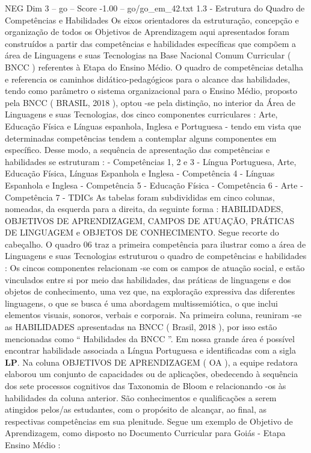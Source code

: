 \begin{textsample}{NEG Dim 3 – go – Score -1.00 – go/go\_em\_42.txt}  \label{ex:f3_neg_246}
1.3 - Estrutura do Quadro de Competências e Habilidades Os eixos orientadores da estruturação, concepção e organização de todos os Objetivos de Aprendizagem aqui apresentados foram construídos a partir das competências e habilidades específicas que compõem a área de Linguagens e suas Tecnologias na Base Nacional Comum Curricular ( BNCC ) referentes à Etapa do Ensino Médio.
O quadro de competências detalha e referencia os caminhos didático-pedagógicos para o alcance das habilidades, tendo como parâmetro o sistema organizacional para o Ensino Médio, proposto pela BNCC ( BRASIL, 2018 ), optou -se pela distinção, no interior da Área de Linguagens e suas Tecnologias, dos cinco componentes curriculares : Arte, Educação Física e Línguas espanhola, Inglesa e Portuguesa - tendo em vista que determinadas competências tendem a contemplar alguns componentes em específico.
Desse modo, a sequência de apresentação das competências e habilidades se estruturam : - Competências 1, 2 e 3 - Língua Portuguesa, Arte, Educação Física, Línguas Espanhola e Inglesa - Competência 4 - Línguas Espanhola e Inglesa - Competência 5 - Educação Física - Competência 6 - Arte - Competência 7 - TDICs As tabelas foram subdivididas em cinco colunas, nomeadas, da esquerda para a direita, da seguinte forma : HABILIDADES, OBJETIVOS DE APRENDIZAGEM, CAMPOS DE ATUAÇÃO, PRÁTICAS DE LINGUAGEM e OBJETOS DE CONHECIMENTO.
Segue recorte do cabeçalho.
O quadro 06 traz a primeira competência para ilustrar como a área de Linguagens e suas Tecnologias estruturou o quadro de competências e habilidades : Os cincos componentes relacionam -se com os campos de atuação social, e estão vinculados entre si por meio das habilidades, das práticas de linguagens e dos objetos de conhecimento, uma vez que, na exploração expressiva das diferentes linguagens, o que se busca é uma abordagem multissemiótica, o que inclui elementos visuais, sonoros, verbais e corporais.
Na primeira coluna, reuniram -se as HABILIDADES apresentadas na BNCC ( Brasil, 2018 ), por isso estão mencionadas como “ Habilidades da BNCC ”.
Em nossa grande área é possível encontrar habilidade associada a Língua Portuguesa e identificadas com a sigla \textbf{LP}.
Na coluna OBJETIVOS DE APRENDIZAGEM ( OA ), a equipe redatora elaborou um conjunto de capacidades ou de aplicações, obedecendo à sequência dos sete processos cognitivos das Taxonomia de Bloom e relacionando -os às habilidades da coluna anterior.
São conhecimentos e qualificações a serem atingidos pelos/as estudantes, com o propósito de alcançar, ao final, as respectivas competências em sua plenitude.
Segue um exemplo de Objetivo de Aprendizagem, como disposto no Documento Curricular para Goiás - Etapa Ensino Médio :

\end{textsample}
